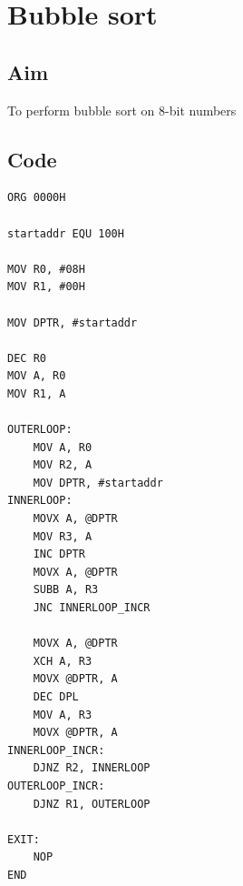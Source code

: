 \section{Bubble sort}
\subsection{Aim}
To perform bubble sort on 8-bit numbers

\subsection{Code}
\begin{lstlisting}
ORG 0000H

startaddr EQU 100H

MOV R0, #08H
MOV R1, #00H

MOV DPTR, #startaddr

DEC R0
MOV A, R0
MOV R1, A

OUTERLOOP:
	MOV A, R0
	MOV R2, A
	MOV DPTR, #startaddr
INNERLOOP:
	MOVX A, @DPTR
	MOV R3, A
	INC DPTR
	MOVX A, @DPTR
	SUBB A, R3
	JNC INNERLOOP_INCR

	MOVX A, @DPTR
	XCH A, R3
	MOVX @DPTR, A
	DEC DPL
	MOV A, R3
	MOVX @DPTR, A
INNERLOOP_INCR:
	DJNZ R2, INNERLOOP
OUTERLOOP_INCR:
	DJNZ R1, OUTERLOOP

EXIT:
	NOP
END
\end{lstlisting}

